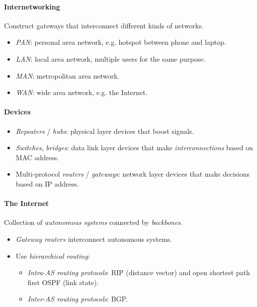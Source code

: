 \documentclass[twocolumn,english]{article}
\begin{document}
\paragraph{Internetworking}

Construct gateways that interconnect different kinds of networks.
\begin{itemize}
\item \emph{PAN}: personal area network, e.g. hotspot between phone and
laptop.
\item \emph{LAN}: local area network, multiple users for the same purpose.
\item \emph{MAN}: metropolitan area network.
\item \emph{WAN}: wide area network, e.g. the Internet.
\end{itemize}

\paragraph{Devices}
\begin{itemize}
\item \emph{Repeaters} / \emph{hubs}: physical layer devices that boost
signals.
\item \emph{Switches}, \emph{bridges}: data link layer devices that make
\emph{interconnections} based on MAC address.
\item Multi-protocol \emph{routers} / \emph{gateways}: network layer devices
that make decisions based on IP address.
\end{itemize}

\paragraph{The Internet}

Collection of \emph{autonomous systems} connected by \emph{backbones}.
\begin{itemize}
\item \emph{Gateway routers} interconnect autonomous systems.
\item Use \emph{hierarchical routing}:
\begin{itemize}
\item \emph{Intra-AS routing protocols}: RIP (distance vector) and open
shortest path first OSPF (link state).
\item \emph{Inter-AS routing protocols}: BGP.
\end{itemize}
\end{itemize}
\end{document}
